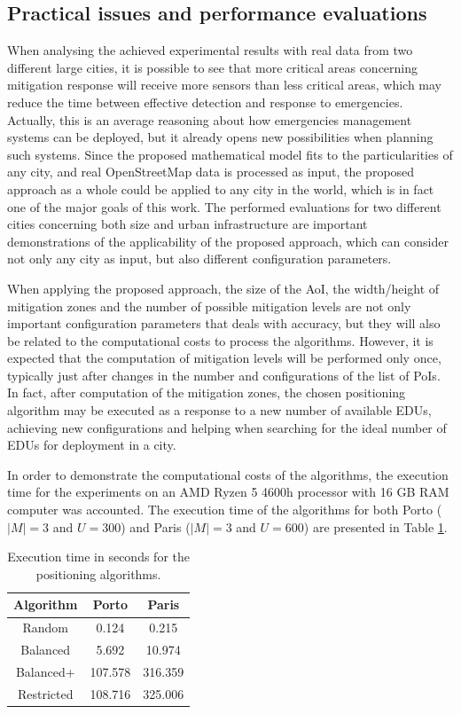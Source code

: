 \begin{refsection}
\subsection{Practical issues and performance evaluations}

When analysing the achieved experimental results with real data from two different large cities, it is possible to see that more critical areas concerning mitigation response will receive more sensors than less critical areas, which may reduce the time between effective detection and response to emergencies. Actually, this is an average reasoning about how emergencies management systems can be deployed, but it already opens new possibilities when planning such systems. Since the proposed mathematical model fits to the particularities of any city, and real OpenStreetMap data is processed as input, the proposed approach as a whole could be applied to any city in the world, which is in fact one of the major goals of this work. The performed evaluations for two different cities concerning both size and urban infrastructure are important demonstrations of the applicability of the proposed approach, which can consider not only any city as input, but also different configuration parameters.

When applying the proposed approach, the size of the AoI, the width/height of mitigation zones and the number of possible mitigation levels are not only important configuration parameters that deals with accuracy, but they will also be related to the computational costs to process the algorithms. However, it is expected that the computation of mitigation levels will be performed only once, typically just after changes in the number and configurations of the list of PoIs. In fact, after computation of the mitigation zones, the chosen positioning algorithm may be executed as a response to a new number of available EDUs, achieving new configurations and helping when searching for the ideal number of EDUs for deployment in a city. 

In order to demonstrate the computational costs of the algorithms, the execution time for the experiments on an AMD Ryzen 5 4600h processor with 16 GB RAM computer was accounted. The execution time of the algorithms for both Porto ($|M|=3$ and $U=300$) and Paris ($|M|=3$ and $U=600$) are presented in Table \ref{Table:costs}.

\begin{table}
  \centering
  \caption{Execution time in seconds for the positioning algorithms.}\label{Table:costs}
  \begin{tabular}{c|c|c}
    \textbf{Algorithm} & \textbf{Porto} & \textbf{Paris} \\
    \hline
    Random  &  0.124 &  0.215 \\ 
    \hline
    Balanced  & 5.692  &  10.974 \\ 
    \hline
    Balanced+  & 107.578 &  316.359  \\ 
    \hline
    Restricted  & 108.716  & 325.006 \\ 
  \end{tabular}
\end{table}


\end{refsection}
